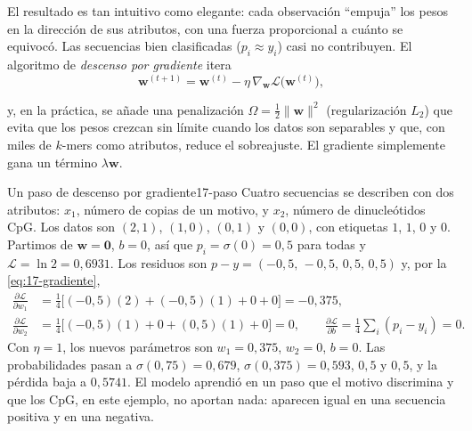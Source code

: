 \begin{simbolos}
\end{simbolos}

El resultado es tan intuitivo como elegante: cada observación ``empuja'' los pesos en la dirección de sus atributos, con una fuerza proporcional a cuánto se equivocó. Las secuencias bien clasificadas ($p_i\approx y_i$) casi no contribuyen. El algoritmo de \emph{descenso por gradiente} itera
\begin{equation}\label{eq:17-descenso}
\mathbf{w}^{(t+1)} = \mathbf{w}^{(t)} - \eta\,\nabla_{\mathbf{w}}\mathcal{L}\big(\mathbf{w}^{(t)}\big),
\end{equation}

\begin{simbolos}
\end{simbolos}

\noindent y, en la práctica, se añade una penalización $\Omega=\tfrac12\|\mathbf{w}\|^2$ (regularización $L_2$) que evita que los pesos crezcan sin límite cuando los datos son separables y que, con miles de $k$-mers como atributos, reduce el sobreajuste. El gradiente simplemente gana un término $\lambda\mathbf{w}$.

\begin{ejemplo}{Un paso de descenso por gradiente}{17-paso}
Cuatro secuencias se describen con dos atributos: $x_1$, número de copias de un motivo, y $x_2$, número de dinucleótidos CpG. Los datos son $(2,1)$, $(1,0)$, $(0,1)$ y $(0,0)$, con etiquetas $1$, $1$, $0$ y $0$. Partimos de $\mathbf{w}=\mathbf{0}$, $b=0$, así que $p_i=\sigma(0)=0{,}5$ para todas y $\mathcal{L}=\ln 2 = 0{,}6931$. Los residuos son $p-y=(-0{,}5,\,-0{,}5,\,0{,}5,\,0{,}5)$ y, por la \cref{eq:17-gradiente},
\begin{align*}
\frac{\partial\mathcal{L}}{\partial w_1} &= \tfrac14\big[(-0{,}5)(2)+(-0{,}5)(1)+0+0\big] = -0{,}375,\\
\frac{\partial\mathcal{L}}{\partial w_2} &= \tfrac14\big[(-0{,}5)(1)+0+(0{,}5)(1)+0\big] = 0,\qquad
\frac{\partial\mathcal{L}}{\partial b} = \tfrac14\textstyle\sum_i(p_i-y_i) = 0.
\end{align*}
Con $\eta=1$, los nuevos parámetros son $w_1=0{,}375$, $w_2=0$, $b=0$. Las probabilidades pasan a $\sigma(0{,}75)=0{,}679$, $\sigma(0{,}375)=0{,}593$, $0{,}5$ y $0{,}5$, y la pérdida baja a $0{,}5741$. El modelo aprendió en un paso que el motivo discrimina y que los CpG, en este ejemplo, no aportan nada: aparecen igual en una secuencia positiva y en una negativa.
\end{ejemplo}


